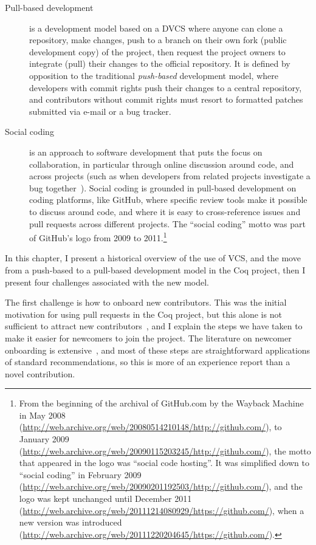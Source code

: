 \begin{description}
	\item[Pull-based development] is a development model based on a DVCS where anyone can clone a repository, make changes, push to a branch on their own fork (public development copy) of the project, then request the project owners to integrate (pull) their changes to the official repository.
	It is defined by opposition to the traditional \emph{push-based} development model, where developers with commit rights push their changes to a central repository, and contributors without commit rights must resort to formatted patches submitted via e-mail or a bug tracker.
	\item[Social coding] is an approach to software development that puts the focus on collaboration, in particular through online discussion around code, and across projects (such as when developers from related projects investigate a bug together~\cite{ma2017developers}). Social coding is grounded in pull-based development on coding platforms, like GitHub, where specific review tools make it possible to discuss around code, and where it is easy to cross-reference issues and pull requests across different projects. The ``social coding'' motto was part of GitHub's logo from 2009 to 2011.\footnote{
		From the beginning of the archival of GitHub.com by the Wayback Machine~\cite{waybackmachine} in May 2008 (\url{http://web.archive.org/web/20080514210148/http://github.com/}), to January 2009 (\url{http://web.archive.org/web/20090115203245/http://github.com/}), the motto that appeared in the logo was ``social code hosting''. It was simplified down to ``social coding'' in February 2009 (\url{http://web.archive.org/web/20090201192503/http://github.com/}), and the logo was kept unchanged until December 2011 (\url{http://web.archive.org/web/20111214080929/https://github.com/}), when a new version was introduced (\url{http://web.archive.org/web/20111220204645/https://github.com/}).
	}
\end{description}

In this chapter, I present a historical overview of the use of VCS, and the move from a push-based to a pull-based development model in the Coq project, then I present four challenges associated with the new model.

The first challenge is how to onboard new contributors.
This was the initial motivation for using pull requests in the Coq project, but this alone is not sufficient to attract new contributors~\cite{dias2016does}, and I explain the steps we have taken to make it easier for newcomers to join the project.
The literature on newcomer onboarding is extensive~\cite{STEINMACHER201567}, and most of these steps are straightforward applications of standard recommendations, so this is more of an experience report than a novel contribution.

